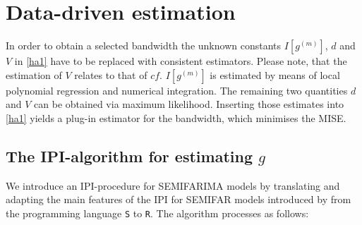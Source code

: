 \documentclass[12pt]{article}
\begin{document}
\section{Data-driven estimation}
In order to obtain a selected bandwidth the unknown constants $I[g^{(m)}]$, $d$ and $V$ in \eqref{ha1} have to be replaced with consistent estimators. Please note, that the estimation of $V$ relates to that of $cf$. $I[g^{(m)}]$ is estimated by means of local polynomial regression and numerical integration. The remaining two quantities $d$ and $V$ can be obtained via maximum likelihood. Inserting those estimates into \eqref{ha1} yields a plug-in estimator for the bandwidth, which minimises the MISE.

\subsection{The IPI-algorithm for estimating $g$}

We introduce an IPI-procedure for SEMIFARIMA models by translating and adapting the main features of the IPI for SEMIFAR models introduced by \citet{beran2002iterative} from the programming language \texttt{S} to \texttt{R}. The algorithm processes as follows:
\end{document}

